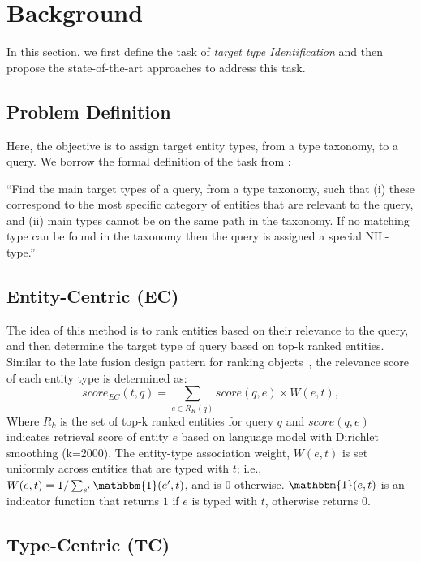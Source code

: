 \section{Background}
In this section, we first define the task of \emph{target type Identification} and then propose the state-of-the-art approaches to address this task.

\subsection{Problem Definition}
Here, the objective is to assign target entity types, from a type taxonomy, to a query. We borrow the formal definition of the task from \citet{Garigliotti:2017:TTI:3077136.3080659}:

``Find the main target types of a query, from a type taxonomy, such that (i) these correspond to the most specific category of entities that are relevant to the query, and (ii) main types cannot be on the same path in the taxonomy. If no matching type can be found in the taxonomy then the query is assigned a special NIL-type.''

\subsection{Entity-Centric (EC)}\label{EC}
The idea of this method is to rank entities based on their relevance to the query, and then determine the target type of query based on top-k ranked entities. Similar to the late fusion design pattern for ranking objects~\cite{zhang2017design}, the relevance score of each entity type is determined as:
\begin{equation}
score_{EC}(t,q) = \sum_{e\in R_K(q)}{score(q,e)\times W(e,t),}
\end{equation}
Where $R_k$ is the set of top-k ranked entities for query $q$ and $score(q,e)$ indicates retrieval score of entity $e$ based on language model with Dirichlet smoothing (k=2000). The entity-type association weight, $W(e,t)$ is set uniformly across entities that are typed with $t$; i.e., $W(e,t)=1/\sum_{e^\prime}{\mathbbm{1}(e^\prime,t)}$, and is 0 otherwise.
$\mathbbm{1}(e,t)$ is an indicator function that returns $1$ if $e$ is typed with $t$, otherwise returns $0$.


\subsection{Type-Centric (TC)} \label{TC}

